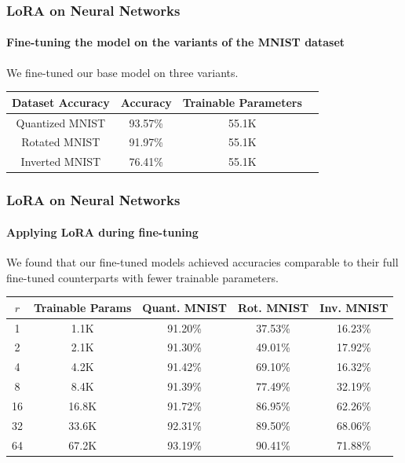\documentclass{beamer}
\begin{document}
    \begin{frame}
        \frametitle{LoRA on Neural Networks}
        \framesubtitle{Fine-tuning the model on the variants of the MNIST dataset}
        We fine-tuned our base model on three variants. 
        \begin{table}[h]
        \centering
        \begin{tabular}{|c|c|c|c|}
        \hline
        Dataset Accuracy & Accuracy & Trainable Parameters \\
        \hline
        Quantized MNIST  &  93.57\% & 55.1K \\
        Rotated MNIST & 91.97\% & 55.1K \\
        Inverted MNIST & 76.41\% & 55.1K \\
        \hline
        \end{tabular}
        \end{table}
    \end{frame}
        \begin{frame}
        \frametitle{LoRA on Neural Networks}
        \framesubtitle{Applying LoRA during fine-tuning}
        We found that our fine-tuned models achieved accuracies comparable to their full fine-tuned counterparts with fewer trainable parameters.
        \begin{center}
            \small %
            \setlength{\tabcolsep}{5pt} %
            \begin{tabular}{c | c | c | c | c}
                $r$ & Trainable Params & Quant. MNIST & Rot. MNIST & Inv. MNIST \\
                \hline
                1 & 1.1K & 91.20\% & 37.53\% & 16.23\% \\
                2 & 2.1K & 91.30\% & 49.01\% & 17.92\% \\
                4 & 4.2K & 91.42\% & 69.10\% & 16.32\% \\
                8 & 8.4K & 91.39\% & 77.49\% & 32.19\% \\
                16 & 16.8K & 91.72\% & 86.95\% & 62.26\% \\
                32 & 33.6K & 92.31\% & 89.50\% & 68.06\% \\
                64 & 67.2K & 93.19\% & 90.41\% & 71.88\%
            \end{tabular}
        \end{center}        
    \end{frame}
\end{document}
